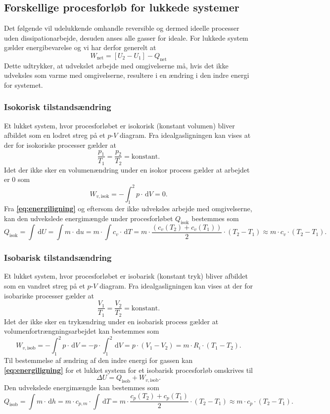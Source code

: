 \subsection{Forskellige procesforløb for lukkede systemer}
Det følgende vil udelukkende omhandle reversible og dermed ideelle processer uden dissipationarbejde, desuden anses alle gasser for ideale. For lukkede system gælder energibevarelse og vi har derfor generelt at
\begin{equation} \label{eq:energiligning}
  W_{\text{net}} = \left[ U_2 - U_1 \right] - Q_{\text{net}}
\end{equation}
Dette udtrykker, at udvekslet arbejde med omgivelserne må, hvis det ikke udveksles som varme med omgivelserne, resultere i en ændring i den indre energi for systemet.

\subsubsection{Isokorisk tilstandsændring}
Et lukket system, hvor procesforløbet er isokorisk (konstant volumen) bliver afbildet som en lodret streg på et $p$-$V$ diagram. Fra idealgasligningen kan vises at der for isokoriske processer gælder at
\[ 
\frac{p_1}{T_1} = \frac{p_2}{T_2} = \mathrm{konstant}
.\]
Idet der ikke sker en volumenændring under en isokor process gælder at arbejdet er 0 som
\[ 
W_{v, \text{isok}} = - \int_{1}^{2} p \cdot \, \mathrm{d}V = 0
.\]
Fra \textbf{\autoref{eq:energiligning}} og eftersom der ikke udveksles arbejde med omgivelserne, kan den udvekslede energimængde under procesforløbet $Q_{\text{isok}}$ bestemmes som
\[ 
  Q_{\text{isok}} = \int \, \mathrm{d}U = \int m \cdot \, \mathrm{d}u = m \cdot \int c_v \cdot \, \mathrm{d}T = m \cdot \frac{\left( c_v(T_2) + c_v(T_1) \right)}{2} \cdot (T_2 - T_1) \approx m \cdot c_v \cdot (T_2 - T_1)
.\]

\subsubsection{Isobarisk tilstandsændring}
Et lukket system, hvor procesforløbet er isobarisk (konstant tryk) bliver afbildet som en vandret streg på et $p$-$V$ diagram. Fra idealgasligningen kan vises at der for isobariske processer gælder at
\[ 
  \frac{V_1}{T_1} = \frac{V_2}{T_2} = \mathrm{konstant}
.\]
Idet der ikke sker en trykændring under en isobarisk process gælder at volumenfortrængningsarbejdet kan bestemmes som
\[ 
W_{v, \text{isob}} = - \int_{1}^{2} p \cdot \, \mathrm{d}V = - p \cdot \int_{1}^{2} \, \mathrm{d}V = p \cdot \left( V_1 - V_2 \right) = m \cdot R_i \cdot \left( T_1 - T_2 \right)
.\]
Til bestemmelse af ændring af den indre energi for gassen kan \textbf{\autoref{eq:energiligning}} for et lukket system for et isobarisk procesforløb omskrives til
\[ 
\Delta U = Q_{\text{isob}} + W_{v, \text{isob}}
.\]
Den udvekslede energimængde kan bestemmes som
\[ 
Q_{\text{isob}} = \int m \cdot \, \mathrm{d}h = m \cdot c_{p,m} \cdot \int \, \mathrm{d}T = m \cdot \frac{c_p(T_2) + c_p(T_1)}{2} \cdot \left( T_2 - T_1 \right) \approx m \cdot c_p \cdot \left( T_2 - T_1 \right)
.\]

